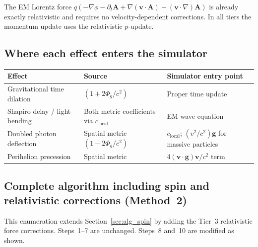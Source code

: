 \documentclass[11pt,a4paper]{article}
\newcommand{\vv}[1]{\mathbf{#1}}
\newcommand{\Phig}{\Phi_g}
\begin{document}
The EM Lorentz force $q(-\nabla\phi - \partial_t\vv{A} + \nabla(\vv{v}\cdot\vv{A}) - (\vv{v}\cdot\nabla)\vv{A})$ is already exactly relativistic and requires no velocity-dependent corrections.  In all tiers the momentum update uses the relativistic $p$-update.

\subsection{Where each effect enters the simulator}

\begin{center}
\begin{tabular}{@{}L{4.5cm}L{4cm}L{4cm}@{}}
\toprule
\textbf{Effect} & \textbf{Source} & \textbf{Simulator entry point} \\
\midrule
Gravitational time dilation & $(1+2\Phig/c^2)$ & Proper time update \\
Shapiro delay / light bending & Both metric coefficients via $c_{\mathrm{local}}$ & EM wave equation \\
Doubled photon deflection & Spatial metric $(1-2\Phig/c^2)$ & $c_{\mathrm{local}}$; $(v^2/c^2)\vv{g}$ for massive particles \\
Perihelion precession & Spatial metric & $4(\vv{v}\cdot\vv{g})\vv{v}/c^2$ term \\
\bottomrule
\end{tabular}
\end{center}

\subsection{Complete algorithm including spin and relativistic corrections (Method~2)}
\label{sec:alg_rel}

This enumeration extends Section~\ref{sec:alg_spin} by adding the Tier~3 relativistic force corrections.  Steps~1--7 are unchanged.  Steps~8 and~10 are modified as shown.
\end{document}
